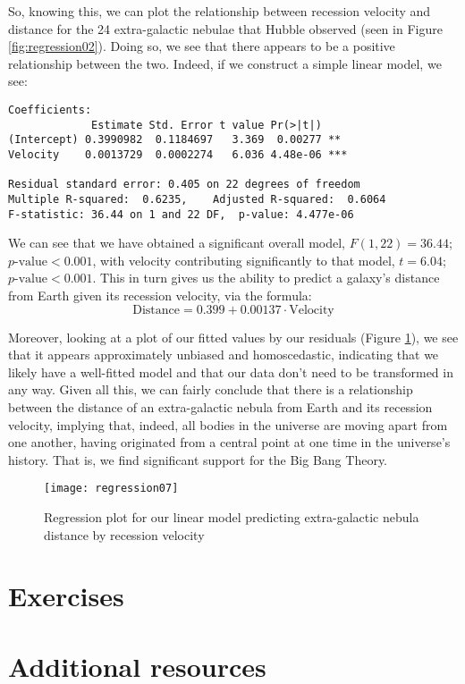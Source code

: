 So, knowing this, we can plot the relationship between recession velocity and distance for the 24 extra-galactic nebulae that Hubble observed (seen in Figure \ref{fig:regression02}). Doing so, we see that there appears to be a positive relationship between the two. Indeed, if we construct a simple linear model, we see:

\begin{framed}
\begin{Verbatim}[samepage=TRUE]
Coefficients:
             Estimate Std. Error t value Pr(>|t|)    
(Intercept) 0.3990982  0.1184697   3.369  0.00277 ** 
Velocity    0.0013729  0.0002274   6.036 4.48e-06 ***

Residual standard error: 0.405 on 22 degrees of freedom
Multiple R-squared:  0.6235,	Adjusted R-squared:  0.6064 
F-statistic: 36.44 on 1 and 22 DF,  p-value: 4.477e-06
\end{Verbatim}
\end{framed}

We can see that we have obtained a significant overall model, $F(1,22) = 36.44$; $p\text{-value}<0.001$, with velocity contributing significantly to that model, $t=6.04$; $p\text{-value}<0.001$. This in turn gives us the ability to predict a galaxy's distance from Earth given its recession velocity, via the formula:
\begin{equation*}
\text{Distance}=0.399+0.00137\cdot\text{Velocity}
\end{equation*}

Moreover, looking at a plot of our fitted values by our residuals (Figure \ref{fig:regression07}), we see that it appears approximately unbiased and homoscedastic, indicating that we likely have a well-fitted model and that our data don't need to be transformed in any way. Given all this, we can fairly conclude that there is a relationship between the distance of an extra-galactic nebula from Earth and its recession velocity, implying that, indeed, all bodies in the universe are moving apart from one another, having originated from a central point at one time in the universe's history. That is, we find significant support for the Big Bang Theory.

\begin{figure}[htp]
\texttt{[image: regression07]}
\caption{Regression plot for our linear model predicting extra-galactic nebula distance by recession velocity}
\label{fig:regression07}
\end{figure}
\section{Exercises}

\section{Additional resources}